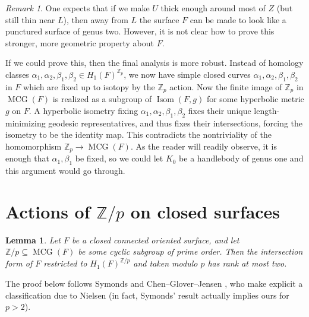 \documentclass[12pt]{article}
\theoremstyle{plain}
\newtheorem{lemma}[theorem]{Lemma}
\theoremstyle{definition}
\theoremstyle{remark}
\newtheorem{remark}[theorem]{Remark}
\numberwithin{equation}{section}
\begin{document}
\begin{remark}
One expects that if we make $U$ thick enough around most of $Z$ (but still thin near $L$), then away from $L$ the surface $F$ can be made to look like a punctured surface of genus two.  However, it is not clear how to prove this stronger, more geometric property about $F$.

If we could prove this, then the final analysis is more robust.  Instead of homology classes $\alpha_1,\alpha_2,\beta_1,\beta_2\in H_1(F)^{\mathbb Z_p}$, we now have simple closed curves $\alpha_1,\alpha_2,\beta_1,\beta_2$ in $F$ which are fixed up to isotopy by the $\mathbb Z_p$ action.  Now the finite image of $\mathbb Z_p$ in $\operatorname{MCG}(F)$ is realized as a subgroup of $\operatorname{Isom}(F,g)$ for some hyperbolic metric $g$ on $F$.  A hyperbolic isometry fixing $\alpha_1,\alpha_2,\beta_1,\beta_2$ fixes their unique length-minimizing geodesic representatives, and thus fixes their intersections, forcing the isometry to be the identity map.  This contradicts the nontriviality of the homomorphism $\mathbb Z_p\to\operatorname{MCG}(F)$.  As the reader will readily observe, it is enough that $\alpha_1,\beta_1$ be fixed, so we could let $K_0$ be a handlebody of genus one and this argument would go through.
\end{remark}

\section{Actions of $\mathbb Z/p$ on closed surfaces}

\begin{lemma}\label{homologyaction}
Let $F$ be a closed connected oriented surface, and let $\mathbb Z/p\subseteq\operatorname{MCG}(F)$ be some cyclic subgroup of prime order.  Then the intersection form of $F$ restricted to $H_1(F)^{\mathbb Z/p}$ and taken modulo $p$ has rank at most two.
\end{lemma}

The proof below follows Symonds \cite[pp389--390 Theorem B]{symonds} and Chen--Glover--Jensen \cite[Theorem 1.1]{chengloverjensen}, who make explicit a classification due to Nielsen \cite{nielsen2} (in fact, Symonds' result actually implies ours for $p>2$).
\end{document}
